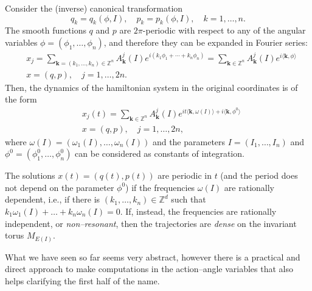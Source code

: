 \documentclass[english,fontsize=11pt,paper=a5,oneside]{scrbook}
\newcommand{\Z}{\mathbb{Z}}
\newcommand{\lag}{\langle}
\newcommand{\rag}{\rangle}
\theoremstyle{definition}
\newenvironment{remark}
  {\pushQED{\qed}\renewcommand{\qedsymbol}{$\lozenge$}\remarkx}
  {\popQED\endremarkx}
\begin{document}
\begin{remark}\label{rmk:nonresonant}
  Consider the (inverse) canonical transformation
  \begin{equation}
    q_k = q_k(\phi, I), \quad p_k = p_k(\phi, I), \quad k=1,\ldots,n.
  \end{equation}
  The smooth functions $q$ and $p$ are $2\pi$-periodic with respect to any of the angular variables $\phi = (\phi_1, \ldots, \phi_n)$, and therefore they can be expanded in Fourier series:
  \begin{align}
     & x_j = \sum_{\bm k = (k_1, \ldots, k_n)\in\Z^n} A^j_{\bm k}(I) e^{i(k_1 \phi_1 + \cdots + k_n \phi_n)} = \sum_{\bm k\in\Z^n} A^j_{\bm k}(I) e^{i\lag\bm k, \phi\rag} \\
     & x = (q,p), \quad j=1,\ldots,2n.
  \end{align}
  Then, the dynamics of the hamiltonian system in the original coordinates is of the form
  \begin{align}
     & x_j(t) = \sum_{\bm k\in\Z^n} A^j_{\bm k}(I) e^{i t\lag\bm k, \omega(I)\rag + i\lag\bm k,\phi^0\rag} \\
     & x = (q,p), \quad j=1,\ldots,2n,
  \end{align}
  where $\omega(I) = (\omega_1(I), \ldots, \omega_n(I))$ and the parameters $I = (I_1, \ldots, I_n)$ and $\phi^0 = (\phi_1^0, \ldots, \phi_n^0)$ can be considered as constants of integration.

  The solutions $x(t) = (q(t), p(t))$ are periodic in $t$ (and the period does not depend on the parameter $\phi^0$) if the frequencies $\omega(I)$ are rationally dependent, i.e., if there is $(k_1, \ldots, k_n)\in\Z^d$ such that $k_1\omega_1(I) + \ldots + k_n \omega_n(I) = 0$.
  If, instead, the frequencies are rationally independent, or \emph{non--resonant}, then the trajectories are \emph{dense} on the invariant torus $M_{E(I)}$.
\end{remark}

What we have seen so far seems very abstract, however there is a practical and direct approach to make computations in the action--angle variables that also helps clarifying the first half of the name.
\end{document}
